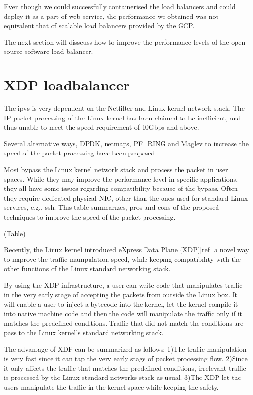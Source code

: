 Even though we could successfully containerised the load balancers and could deploy it as a part of web service, the performance we obtained was not equivalent that of scalable load balancers provided by the GCP.

The next section will disscuss how to improve the performance levels of the open source software load balancer. 

\section{XDP loadbalancer}\label{XDP loadbalancer}

The ipvs is very dependent on the Netfilter and Linux kernel network stack.
The IP packet processing of the Linux kernel has been claimed to be inefficient, and thus unable to meet the speed requirement of 10Gbps and above.

Several alternative ways, DPDK, netmaps, PF\_RING and Maglev to increase the speed of the packet processing have been proposed.

Most bypass the Linux kernel network stack and process the packet in user spaces.
While they may improve the performance level in specific applications, they all have some issues regarding compatibility because of the bypass.
Often they require dedicated physical NIC, other than the ones used for standard Linux services, e.g., ssh.
This table summarizes, pros and cons of the proposed techniques to improve the speed of the packet processing.

(Table)

Recently, the Linux kernel introduced eXpress Data Plane (XDP)[ref] a novel way to improve the traffic manipulation speed, while keeping compatibility with the other functions of the Linux standard networking stack.

By using the XDP infrastructure, a user can write code that manipulates traffic in the very early stage of accepting the packets from outside the Linux box.
It will enable a user to inject a bytecode into the kernel, let the kernel compile it into native machine code and then the code will manipulate the traffic only if it matches the predefined conditions.
Traffic that did not match the conditions are pass to the Linux kernel's standard networking stack.

The advantage of XDP can be summarized as follows:
1)The traffic manipulation is very fast since it can tap the very early stage of packet processing flow.
2)Since it only affects the traffic that matches the predefined conditions, irrelevant traffic is processed by the Linux standard networks stack as usual.
3)The XDP let the users manipulate the traffic in the kernel space while keeping the safety.

